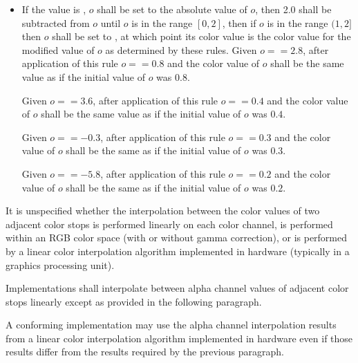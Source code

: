\begin{itemize}
\begin{itemize}
	\item If the  value is , $o$ shall be set to the absolute value of $o$, then 2.0 shall be subtracted from $o$ until $o$ is in the range $[0,2]$, then if $o$ is in the range $(1,2]$ then $o$ shall be set to , at which point its color value is the color value for the modified value of $o$ as determined by these rules.
	\enterexample
	Given $o == 2.8$, after application of this rule $o == 0.8$ and the color value of $o$ shall be the same value as if the initial value of $o$ was $0.8$.
	
	Given $o == 3.6$, after application of this rule $o == 0.4$ and the color value of $o$ shall be the same value as if the initial value of $o$ was $0.4$.
	
	Given $o == -0.3$, after application of this rule $o == 0.3$ and the color value of $o$ shall be the same as if the initial value of $o$ was $0.3$.
	
	Given $o == -5.8$, after application of this rule $o == 0.2$ and the color value of $o$ shall be the same as if the initial value of $o$ was $0.2$.
	\exitexample
	\end{itemize}
\end{itemize}

\pnum
It is unspecified whether the interpolation between the color values of two adjacent color stops is performed linearly on each color channel, is performed within an RGB color space (with or without gamma correction), or is performed by a linear color interpolation algorithm implemented in hardware (typically in a graphics processing unit).

\pnum
Implementations shall interpolate between alpha channel values of adjacent color stops linearly except as provided in the following paragraph.

\pnum
A conforming implementation may use the alpha channel interpolation results from a linear color interpolation algorithm implemented in hardware even if those results differ from the results required by the previous paragraph.
